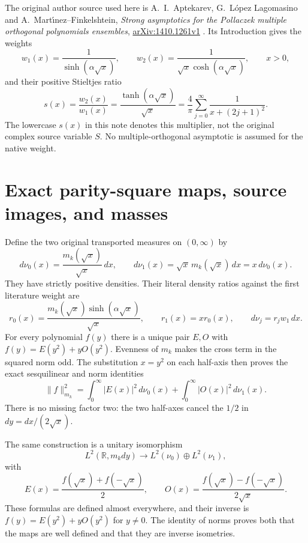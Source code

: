 \documentclass[11pt]{article}
\newcommand{\R}{\mathbb R}
\begin{document}
The original author source used here is A.~I.~Aptekarev,
G.~L\'opez Lagomasino and A.~Mart\'{\i}nez--Finkelshtein,
\emph{Strong asymptotics for the Pollaczek multiple orthogonal
polynomials ensembles},
\href{https://arxiv.org/abs/1410.1261v1}{arXiv:1410.1261v1}
\cite{ALM}.
Its Introduction gives the weights
\begin{equation}\label{eq:literature}
 w_1(x)=\frac1{\sinh(\alpha\sqrt x)},\qquad
 w_2(x)=\frac1{\sqrt x\cosh(\alpha\sqrt x)},\qquad x>0,
\end{equation}
and their positive Stieltjes ratio
\begin{equation}\label{eq:S}
 s(x)=\frac{w_2(x)}{w_1(x)}
     =\frac{\tanh(\alpha\sqrt x)}{\sqrt x}
     =\frac4\pi\sum_{j=0}^{\infty}\frac1{x+(2j+1)^2}.
\end{equation}
The lowercase $s(x)$ in this note denotes this multiplier, not
the original complex source variable $S$. No multiple-orthogonal
asymptotic is assumed for the native weight.

\section{Exact parity-square maps, source images, and masses}

Define the two original transported measures on $(0,\infty)$ by
\begin{equation}\label{eq:nu}
 d\nu_0(x)=\frac{m_k(\sqrt x)}{\sqrt x}\,dx,
 \qquad d\nu_1(x)=\sqrt x\,m_k(\sqrt x)\,dx=x\,d\nu_0(x).
\end{equation}
They have strictly positive densities. Their literal density
ratios against the first literature weight are
\begin{equation}\label{eq:ratios}
 r_0(x)=\frac{m_k(\sqrt x)\sinh(\alpha\sqrt x)}{\sqrt x},
 \qquad r_1(x)=x r_0(x),\qquad d\nu_j=r_jw_1\,dx.
\end{equation}
For every polynomial $f(y)$ there is a unique pair $E,O$ with
$f(y)=E(y^2)+yO(y^2)$. Evenness of $m_k$ makes the cross term in
the squared norm odd. The substitution $x=y^2$ on each half-axis
then proves the exact sesquilinear and norm identities
\begin{equation}\label{eq:parity-norm}
 \|f\|_{m_k}^2=\int_0^\infty|E(x)|^2\,d\nu_0(x)
                    +\int_0^\infty|O(x)|^2\,d\nu_1(x).
\end{equation}
There is no missing factor two: the two half-axes cancel the
$1/2$ in $dy=dx/(2\sqrt x)$.

The same construction is a unitary isomorphism
\[
 L^2(\R,m_kdy)\longrightarrow L^2(\nu_0)\oplus L^2(\nu_1),
\]
with
\[
 E(x)=\frac{f(\sqrt x)+f(-\sqrt x)}2,\qquad
 O(x)=\frac{f(\sqrt x)-f(-\sqrt x)}{2\sqrt x}.
\]
These formulas are defined almost everywhere, and their inverse
is $f(y)=E(y^2)+yO(y^2)$ for $y\ne0$. The identity of norms proves
both that the maps are well defined and that they are inverse
isometries.
\end{document}
